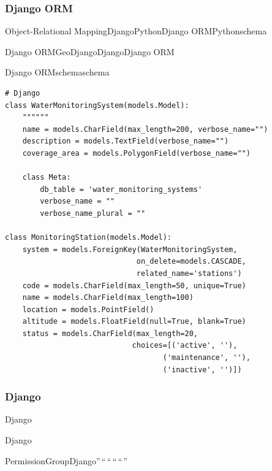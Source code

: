 \hypertarget{django-orm}{%
\subsubsection{Django ORM}\label{django-orm}}

Object-Relational MappingDjangoPythonDjango
ORM\important{}\important{}Python\important{}schema\important{}

Django ORM\important{}GeoDjangoDjango\important{}Django ORM\important{}

\important{}Django ORMschemaschema

\begin{lstlisting}[style=python]
# Django
class WaterMonitoringSystem(models.Model):
    """"""
    name = models.CharField(max_length=200, verbose_name="")
    description = models.TextField(verbose_name="")
    coverage_area = models.PolygonField(verbose_name="")
    
    class Meta:
        db_table = 'water_monitoring_systems'
        verbose_name = ""
        verbose_name_plural = ""

class MonitoringStation(models.Model):
    system = models.ForeignKey(WaterMonitoringSystem, 
                              on_delete=models.CASCADE,
                              related_name='stations')
    code = models.CharField(max_length=50, unique=True)
    name = models.CharField(max_length=100)
    location = models.PointField()
    altitude = models.FloatField(null=True, blank=True)
    status = models.CharField(max_length=20, 
                             choices=[('active', ''), 
                                    ('maintenance', ''),
                                    ('inactive', '')])
\end{lstlisting}

\hypertarget{django-1}{%
\subsubsection{Django}\label{django-1}}

Django\important{}\important{}\important{}\important{}

\important{}Django\important{}\important{}

\important{}PermissionGroupDjango''\,``\,``\,``\,``\,''

\important{}

